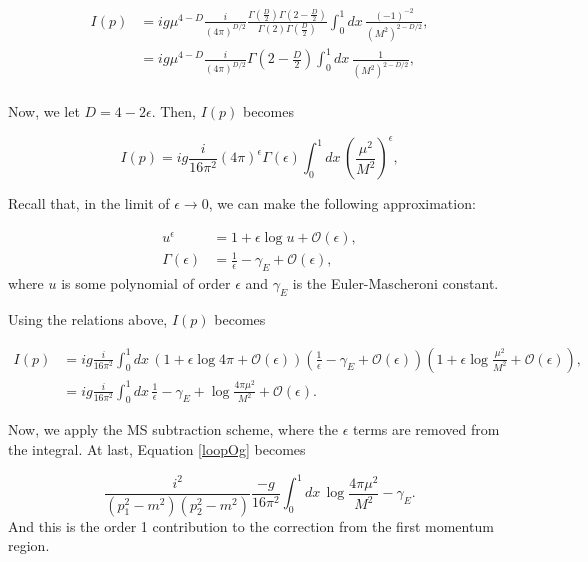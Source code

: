 \documentclass{article}
\begin{document}
\begin{equation}
    \begin{split}
        I(p) &= ig\mu^{4-D} \frac{i}{(4\pi)^{D/2}}\frac{\Gamma(\frac{D}{2})\Gamma(2-\frac{D}{2})}{\Gamma(2)\Gamma(\frac{D}{2})}\int^1_0 dx \, \frac{(-1)^{-2}}{(M^2)^{2-D/2}},\\
        &= ig\mu^{4-D} \frac{i}{(4\pi)^{D/2}}\Gamma(2-\frac{D}{2})\int^1_0 dx \, \frac{1}{(M^2)^{2-D/2}},\\
    \end{split}
\end{equation}

Now, we let $D=4-2\epsilon$. Then, $I(p)$ becomes

\begin{equation}
    I(p)=ig\frac{i}{16\pi^2}(4\pi)^{\epsilon}\Gamma(\epsilon)\int^1_0 dx \, \left(\frac{\mu^2}{M^2}\right)^{\epsilon},
\end{equation}

Recall that, in the limit of $\epsilon\rightarrow 0$, we can make the following approximation:

\begin{equation}
\begin{split}
    u^\epsilon &= 1 + \epsilon \log{u} + \mathcal{O}(\epsilon),\\
    \Gamma(\epsilon) &= \frac{1}{\epsilon} - \gamma_E + \mathcal{O}(\epsilon),
\end{split}
\end{equation}
where $u$ is some polynomial of order $\epsilon$ and $\gamma_E$ is the Euler-Mascheroni constant.

Using the relations above, $I(p)$ becomes

\begin{equation}
    \begin{split}
       I(p)&=ig\frac{i}{16\pi^2}\int^1_0 dx \, (1+\epsilon\log{4\pi} + \mathcal{O}(\epsilon))(\frac{1}{\epsilon} - \gamma_E + \mathcal{O}(\epsilon))(1+\epsilon\log{\frac{\mu^2}{M^2}}+ \mathcal{O}(\epsilon)),\\
       &=ig\frac{i}{16\pi^2}\int^1_0 dx \, \frac{1}{\epsilon} - \gamma_E + \log{\frac{4\pi\mu^2}{M^2}} + \mathcal{O}(\epsilon).
    \end{split}
\end{equation}

Now, we apply the MS subtraction scheme, where the $\epsilon$ terms are removed from the integral. At last, Equation \ref{loopOg} becomes 

\begin{equation}
     \frac{i^2}{(p_1^2-m^2)(p_2^2-m^2)}\frac{-g}{16\pi^2}\int^1_0 dx \, \log{\frac{4\pi\mu^2}{M^2}} - \gamma_E.
\end{equation}
And this is the order 1 contribution to the correction from the first momentum region.
\end{document}
